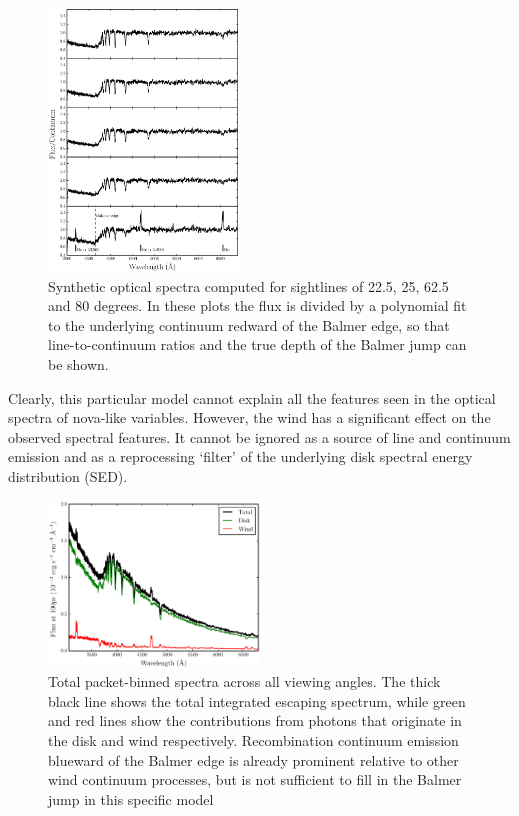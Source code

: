 \documentclass[preprint, a4paper, 11pt]{aastex}
\begin{document}
\begin{figure} 
\includegraphics[width=0.45\textwidth]{figures/fig6_opt_cont.eps}
\caption{Synthetic optical spectra computed for 
sightlines of 22.5, 25, 62.5 and 80 degrees. In these plots
the flux is divided by a polynomial fit to the 
underlying continuum redward of the Balmer edge, so that 
line-to-continuum ratios and the true depth of the
Balmer jump can be shown.}
\label{spec_continuum}
\end{figure} 


Clearly, this particular model cannot explain all
the features seen in the optical spectra of nova-like variables. However,
the wind has a significant effect on the observed spectral features. 
It cannot be ignored as a source of line and continuum emission and as a reprocessing `filter'
of the underlying disk spectral energy distribution (SED).



\begin{figure} 
\includegraphics[width=0.5\textwidth]{figures/fig7_escaping.eps}
\caption{Total packet-binned spectra across all viewing angles. 
The thick black line shows the total 
integrated escaping spectrum, while green and red lines show the contributions from photons that originate
in the disk and wind respectively. Recombination continuum emission blueward of the Balmer 
edge is already prominent relative to other wind continuum processes, but is not sufficient
to fill in the Balmer jump in this specific model}
\label{cont}
\end{figure} 
\end{document}
